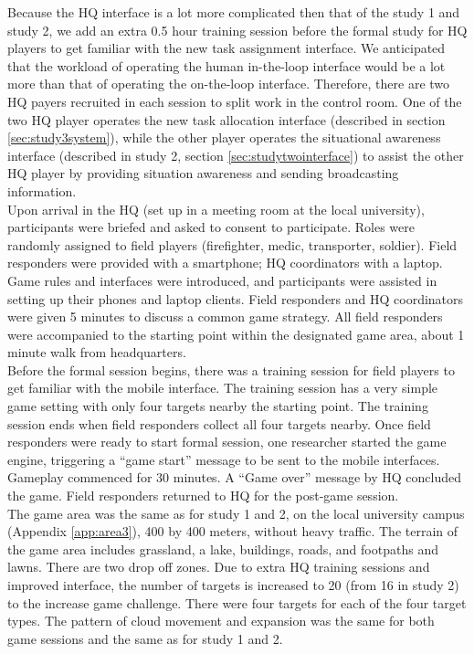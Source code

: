 Because the HQ interface is a lot more complicated then that of the study 1 and study 2, we add an extra 0.5 hour training session before the formal study for HQ players to get familiar with the new task assignment interface. We anticipated that the workload of operating the human in-the-loop interface would be a lot more than that of operating the on-the-loop interface. Therefore, there are two HQ payers recruited in each session to split work in the control room. One of the two HQ player operates the new task allocation interface (described in section \ref{sec:study3system}), while the other player operates the situational awareness interface (described in study 2, section \ref{sec:studytwointerface}) to assist the other HQ player by providing situation awareness and sending broadcasting information. \\

Upon arrival in the HQ (set up in a meeting room at the local university), participants were briefed and asked to consent to participate. Roles were randomly assigned to field players (firefighter, medic, transporter, soldier). Field responders were provided with a smartphone; HQ coordinators with a laptop. Game rules and interfaces were introduced, and participants were assisted in setting up their phones and laptop clients. Field responders and HQ coordinators were given 5 minutes to discuss a common game strategy. All field responders were accompanied to the starting point within the designated game area, about 1 minute walk from headquarters.\\

Before the formal session begins, there was a training session for field players to get familiar with the mobile interface. The training session has a very simple game setting with only four targets nearby the starting point. The training session ends when field responders collect all four targets nearby. Once field responders were ready to start formal session, one researcher started the game engine, triggering a ``game start'' message to be sent to the mobile interfaces. Gameplay commenced for 30 minutes. A ``Game over'' message by HQ concluded the game. Field responders returned to HQ for the post-game session.\\

The game area was the same as for study 1 and 2, on the local university campus (Appendix \ref{app:area3}), 400 by 400 meters, without heavy traffic. The terrain of the game area includes grassland, a lake, buildings, roads, and footpaths and lawns. There are two drop off zones. Due to extra HQ training sessions and improved interface, the number of targets is increased to 20 (from 16 in study 2) to the increase game challenge.  There were four targets for each of the four target types. The pattern of cloud movement and expansion was the same for both game sessions and the same as for study 1 and 2.\\

